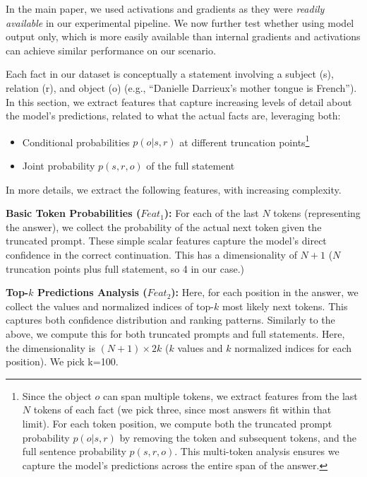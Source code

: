 In the main paper, we used activations and gradients as they were \textit{readily available} in our experimental pipeline. We now further test whether using model output only, which is more easily available than internal gradients and activations can achieve similar performance on our scenario. 

Each fact in our dataset is conceptually a statement involving a subject (s), relation (r), and object (o) (e.g., ``Danielle Darrieux's mother tongue is French''). In this section, we extract features that capture increasing levels of detail about the model's predictions, related to what the actual facts are, leveraging both:
\begin{itemize}
    \item Conditional probabilities $p(o|s,r)$ at different truncation points\footnote{Since the object $o$ can span multiple tokens, we extract features from the last $N$ tokens of each fact (we pick three, since most answers fit within that limit). For each token position, we compute both the truncated prompt probability $p(o|s,r)$ by removing the token and subsequent tokens, and the full sentence probability $p(s,r,o)$. This multi-token analysis ensures we capture the model's predictions across the entire span of the answer.}
    \item Joint probability $p(s,r,o)$ of the full statement
\end{itemize}

In more details, we extract the following features, with increasing complexity. 

\noindent \textbf{Basic Token Probabilities ($Feat_1$):}
For each of the last $N$ tokens (representing the answer), we collect the  probability of the actual next token given the truncated prompt. These simple scalar features capture the model's direct confidence in the correct continuation. This has a dimensionality of $N + 1$ ($N$ truncation points plus full statement, so 4 in our case.)


\noindent \textbf{Top-$k$ Predictions Analysis ($Feat_2$):}
Here, for each position in the answer, we collect the values and normalized indices of top-$k$ most likely next tokens. This captures both confidence distribution and ranking patterns. Similarly to the above, we compute this for both truncated prompts and full statements. Here, the dimensionality is $(N + 1) \times 2k$ ($k$ values and $k$ normalized indices for each position). We pick k=100.


